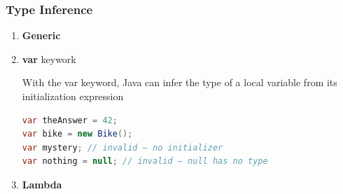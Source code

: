 \documentclass[12pt, a4paper]{report}
\begin{document}
    \subsubsection{Type Inference}
        \begin{enumerate}
            \item \textbf{Generic}
            \item \textbf{var} keywork \par 
            With the var keyword, Java can infer the type of a local variable from its initialization expression
            \begin{lstlisting}[language=Java]
var theAnswer = 42;
var bike = new Bike();
var mystery; // invalid – no initializer
var nothing = null; // invalid – null has no type
            \end{lstlisting}
            \item \textbf{Lambda}
        \end{enumerate}
\end{document}
